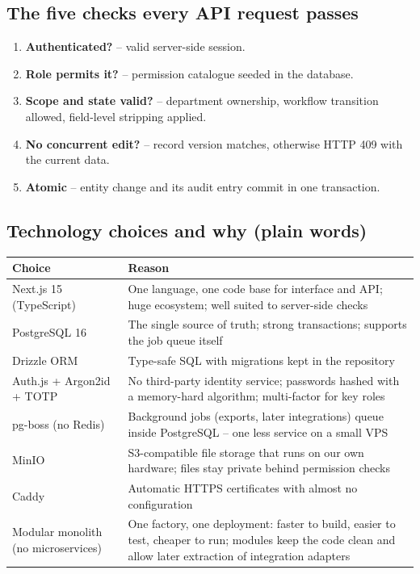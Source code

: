 \subsection{The five checks every API request passes}

\begin{enumerate}
  \item \textbf{Authenticated?} -- valid server-side session.
  \item \textbf{Role permits it?} -- permission catalogue seeded in the database.
  \item \textbf{Scope and state valid?} -- department ownership, workflow transition
        allowed, field-level stripping applied.
  \item \textbf{No concurrent edit?} -- record version matches, otherwise HTTP 409 with
        the current data.
  \item \textbf{Atomic} -- entity change and its audit entry commit in one transaction.
\end{enumerate}

\subsection{Technology choices and why (plain words)}

\begin{tabularx}{\textwidth}{@{}l X@{}}
\toprule
\textbf{Choice} & \textbf{Reason} \\
\midrule
Next.js 15 (TypeScript) & One language, one code base for interface and API; huge
  ecosystem; well suited to server-side checks \\
PostgreSQL 16 & The single source of truth; strong transactions; supports the job queue
  itself \\
Drizzle ORM & Type-safe SQL with migrations kept in the repository \\
Auth.js + Argon2id + TOTP & No third-party identity service; passwords hashed with a
  memory-hard algorithm; multi-factor for key roles \\
pg-boss (no Redis) & Background jobs (exports, later integrations) queue inside
  PostgreSQL -- one less service on a small VPS \\
MinIO & S3-compatible file storage that runs on our own hardware; files stay private
  behind permission checks \\
Caddy & Automatic HTTPS certificates with almost no configuration \\
Modular monolith (no microservices) & One factory, one deployment: faster to build,
  easier to test, cheaper to run; modules keep the code clean and allow later extraction
  of integration adapters \\
\bottomrule
\end{tabularx}

